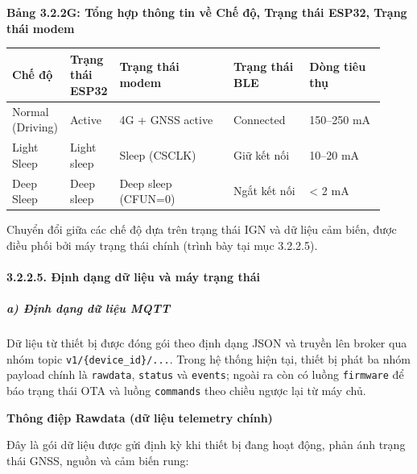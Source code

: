 \documentclass[13pt,a4paper]{extarticle}
\newcounter{none} %
\newcommand{\thesislongtableorignewline}{}
\let\thesislongtableorignewline\\
\renewcommand{\\}{\thesislongtableorignewline\hline}%
\let\\\thesislongtableorignewline
\newcommand{\thesistabletitle}[1]{%
  \begin{center}\textbf{#1}\end{center}%
}
\begin{document}
{\def\LTcaptype{none} %
\thesistabletitle{Bảng 3.2.2G: Tổng hợp thông tin về Chế độ, Trạng thái ESP32, Trạng thái modem}

\begin{longtable}{|p{0.12\linewidth}|p{0.10\linewidth}|p{0.30\linewidth}|p{0.20\linewidth}|p{0.20\linewidth}|}
\hline \textbf{Chế độ} & \textbf{Trạng thái ESP32} & \textbf{Trạng thái modem} & \textbf{Trạng thái BLE} & \textbf{Dòng
tiêu thụ} \\
\hline
\endhead
\hline
\endlastfoot
Normal (Driving) & Active & 4G + GNSS active & Connected & 150--250
mA \\
Light Sleep & Light sleep & Sleep (CSCLK) & Giữ kết nối & 10--20 mA \\
Deep Sleep & Deep sleep & Deep sleep (CFUN=0) & Ngắt kết nối &
\textless{} 2 mA \\
\end{longtable}
}

Chuyển đổi giữa các chế độ dựa trên trạng thái IGN và dữ liệu cảm biến,
được điều phối bởi máy trạng thái chính (trình bày tại mục 3.2.2.5).

\paragraph{3.2.2.5. Định dạng dữ liệu và máy trạng
thái}\label{3225-ux111ux1ecbnh-dux1ea1ng-dux1eef-liux1ec7u-vuxe0-muxe1y-trux1ea1ng-thuxe1i}

\subparagraph{a) Định dạng dữ liệu
MQTT}\label{a-ux111ux1ecbnh-dux1ea1ng-dux1eef-liux1ec7u-mqtt}

Dữ liệu từ thiết bị được đóng gói theo định dạng JSON và truyền lên
broker qua nhóm topic \texttt{v1/\{device\_id\}/...}. Trong hệ thống
hiện tại, thiết bị phát ba nhóm payload chính là \texttt{rawdata},
\texttt{status} và \texttt{events}; ngoài ra còn có luồng
\texttt{firmware} để báo trạng thái OTA và luồng \texttt{commands} theo
chiều ngược lại từ máy chủ.

\textbf{Thông điệp Rawdata (dữ liệu telemetry chính)}

Đây là gói dữ liệu được gửi định kỳ khi thiết bị đang hoạt động, phản
ánh trạng thái GNSS, nguồn và cảm biến rung:
\end{document}

